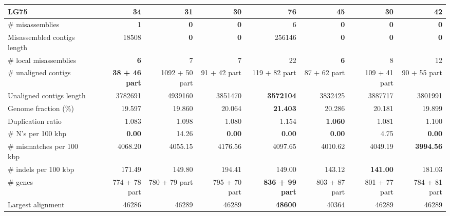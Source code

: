 \documentclass[12pt,a4paper]{article}
\begin{document}
\begin{table}[ht]
\begin{center}
\begin{tabular}{|l*{7}{|r}|}
LG75 & 34 & 31 & {\bf 30} & 76 & 45 & {\bf 30} & 42 \\ \hline
\# misassemblies & 1 & {\bf 0} & {\bf 0} & 6 & {\bf 0} & {\bf 0} & {\bf 0} \\ \hline
Misassembled contigs length & 18508 & {\bf 0} & {\bf 0} & 256146 & {\bf 0} & {\bf 0} & {\bf 0} \\ \hline
\# local misassemblies & {\bf 6} & 7 & 7 & 22 & {\bf 6} & 8 & 12 \\ \hline
\# unaligned contigs & {\bf 38 + 46 part} & 1092 + 50 part & 91 + 42 part & 119 + 82 part & 87 + 62 part & 109 + 41 part & 90 + 55 part \\ \hline
Unaligned contigs length & 3782691 & 4939160 & 3851470 & {\bf 3572104} & 3832425 & 3887717 & 3801991 \\ \hline
Genome fraction (\%) & 19.597 & 19.860 & 20.064 & {\bf 21.403} & 20.286 & 20.181 & 19.899 \\ \hline
Duplication ratio & 1.083 & 1.098 & 1.080 & 1.154 & {\bf 1.060} & 1.081 & 1.100 \\ \hline
\# N's per 100 kbp & {\bf 0.00} & 14.26 & {\bf 0.00} & {\bf 0.00} & {\bf 0.00} & 4.75 & {\bf 0.00} \\ \hline
\# mismatches per 100 kbp & 4068.20 & 4055.15 & 4176.56 & 4097.65 & 4010.62 & 4049.19 & {\bf 3994.56} \\ \hline
\# indels per 100 kbp & 171.49 & 149.80 & 194.41 & 149.00 & 143.12 & {\bf 141.00} & 181.03 \\ \hline
\# genes & 774 + 78 part & 780 + 79 part & 795 + 70 part & {\bf 836 + 99 part} & 803 + 87 part & 801 + 77 part & 784 + 81 part \\ \hline
Largest alignment & 46286 & 46289 & 46289 & {\bf 48600} & 40364 & 46289 & 46289 \\ \hline
\end{tabular}
\end{center}
\end{table}
\end{document}
